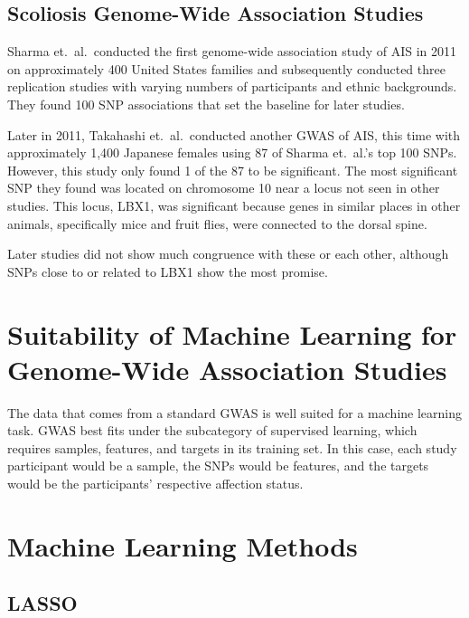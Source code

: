 \documentclass[12pt]{report}
\begin{document}
\subsection{Scoliosis Genome-Wide Association Studies}

Sharma et.\ al.\ conducted the first genome-wide association study of AIS in 2011 
on approximately 400 United States families and subsequently conducted three
replication studies with varying numbers of participants and ethnic backgrounds.
They found 100 SNP associations that set the baseline for later studies.

Later in 2011, Takahashi et.\ al.\ conducted another GWAS of AIS, this time with
approximately 1,400 Japanese females using 87 of Sharma et.\ al.'s top 100 SNPs.
However, this study only found 1 of the 87 to be significant. The most significant
SNP they found was located on chromosome 10 near a locus not seen in other studies.
This locus, LBX1, was significant because genes in similar places in other animals,
specifically mice and fruit flies, were connected to the dorsal spine.

Later studies did not show much congruence with these or each other, although 
SNPs close to or related to LBX1 show the most promise\cite{Zhao2015}.


\section{Suitability of Machine Learning for Genome-Wide Association Studies}
The data that comes from a standard GWAS is well suited for a machine learning task.
GWAS best fits under the subcategory of supervised learning, which requires samples,
features, and targets in its training set. In this case, each study participant 
would be a sample, the SNPs would be features, and the targets would be the participants'
respective affection status.



\section{Machine Learning Methods}
\subsection{LASSO}
\end{document}
